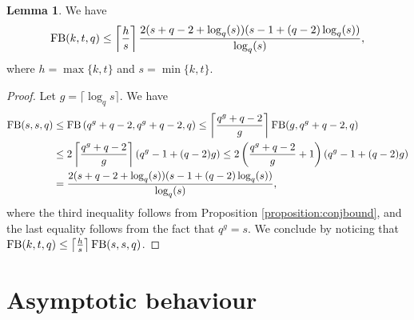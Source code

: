 \documentclass[11pt,a4paper]{article}
\theoremstyle{definition}
\newtheorem{lemma}[theorem]{Lemma}
\newcommand{\fb}{\textnormal{FB}}
\begin{document}
\begin{lemma}\label{lemma:upperbound}
 We have
 \begin{equation*}
     \fb(k,t,q)\leq\left\lceil\frac{h}{s}\right\rceil\frac{2(s+q-2+\log_q(s))(s-1+(q-2)\log_q(s))}{\log_q(s)},
 \end{equation*}
 where $h=\max\{k,t\}$ and $s=\min\{k,t\}$.
\end{lemma}
\begin{proof}
 Let $g=\lceil \log_q s\rceil$. We have
    \begin{equation*}
    \begin{split}
        \fb(s,s,q)&\leq \fb\left(q^g+q-2,q^g+q-2,q\right)\leq\left\lceil \frac{q^g+q-2}{g}\right\rceil\fb(g,q^g+q-2,q)\\
        &\leq 2\left\lceil \frac{q^g+q-2}{g}\right\rceil\left(q^g-1+(q-2)g\right)\leq 2\left(\frac{q^g+q-2}{g}+1\right)\left(q^g-1+(q-2)g\right) \\
        &=\frac{2(s+q-2+\log_q(s))(s-1+(q-2)\log_q(s))}{\log_q(s)},
    \end{split}
    \end{equation*} 
where the third inequality follows from Proposition \ref{proposition:conjbound}, and the last equality follows from the fact that $q^g=s$. We conclude by noticing that $\fb(k,t,q)\leq\left\lceil\frac{h}{s}\right\rceil\fb(s,s,q)$.
\end{proof}

\section{Asymptotic behaviour}
\end{document}
